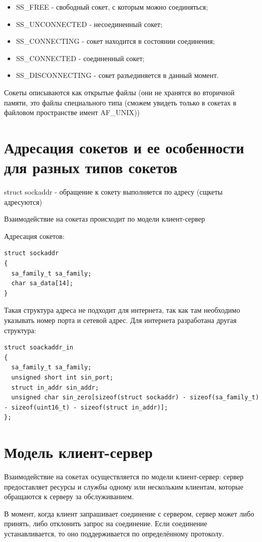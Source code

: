 \begin{itemize}
\item SS\_FREE - свободный сокет, с которым можно соединяться;
\item SS\_UNCONNECTED - несоединенный сокет;
\item SS\_CONNECTING - сокет находится в состоянии соединения;
\item SS\_CONNECTED - соединенный сокет;
\item SS\_DISCONNECTING - сокет разъединяется в данный момент.
\end{itemize}

Сокеты описываются как открытые файлы (они не хранятся во вторичной памяти, это файлы специального типа (сможем увидеть только в сокетах в файловом пространстве имент AF\_UNIX))

\section{Адресация сокетов и ее особенности для разных типов сокетов}

struct sockaddr - обращение к сокету выполняется по адресу (сщкеты адресуются)

Взаимодействие на сокетаз происходит по модели клиент-сервер

Адресация сокетов:
\begin{lstlisting}
struct sockaddr
{
  sa_family_t sa_family;
  char sa_data[14]; 
}
\end{lstlisting}
Такая структура адреса не подходит для интернета, так как там необходимо указывать номер порта и сетевой адрес. Для интернета разработана другая структура:

\begin{lstlisting}
struct soackaddr_in
{
  sa_family_t sa_family;
  unsigned short int sin_port;
  struct in_addr sin_addr;
  unsigned char sin_zero[sizeof(struct sockaddr) - sizeof(sa_family_t) - sizeof(uint16_t) - sizeof(struct in_addr)];
};
\end{lstlisting}

\section{Модель клиент-сервер}
Взаимодействие на сокетах осуществляется по модели клиент-сервер: сервер предоставляет ресурсы и службы одному или нескольким клиентам, которые обращаются к серверу за обслуживанием. 

В момент, когда клиент запрашивает соединение с сервером, сервер может либо принять, либо отклонить запрос на соединение. Если соединение устанавливается, то оно поддерживается по определённому протоколу.
